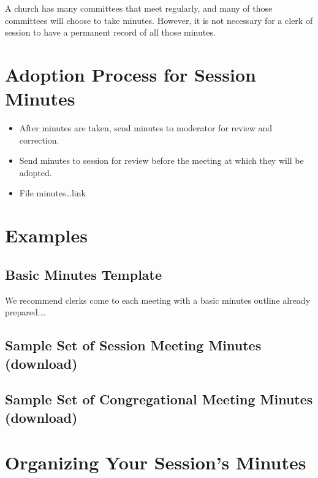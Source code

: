 \documentclass[
]{book}
\providecommand{\tightlist}{%
  \setlength{\itemsep}{0pt}\setlength{\parskip}{0pt}}
\begin{document}
A church has many committees that meet regularly, and many of those committees will choose to take minutes. However, it is not necessary for a clerk of session to have a permanent record of all those minutes.

\hypertarget{adoption-process-for-session-minutes}{%
\section{Adoption Process for Session Minutes}\label{adoption-process-for-session-minutes}}

\begin{itemize}
\tightlist
\item
  After minutes are taken, send minutes to moderator for review and correction.
\item
  Send minutes to session for review before the meeting at which they will be adopted.
\item
  File minutes\ldots link
\end{itemize}

\hypertarget{examples}{%
\section{Examples}\label{examples}}

\hypertarget{basic-minutes-template}{%
\subsection{Basic Minutes Template}\label{basic-minutes-template}}

We recommend clerks come to each meeting with a basic minutes outline already prepared.\ldots{}

\hypertarget{sample-set-of-session-meeting-minutes-download}{%
\subsection{Sample Set of Session Meeting Minutes (download)}\label{sample-set-of-session-meeting-minutes-download}}

\hypertarget{sample-set-of-congregational-meeting-minutes-download}{%
\subsection{Sample Set of Congregational Meeting Minutes (download)}\label{sample-set-of-congregational-meeting-minutes-download}}

\hypertarget{organizing-your-sessions-minutes}{%
\section{Organizing Your Session's Minutes}\label{organizing-your-sessions-minutes}}
\end{document}
